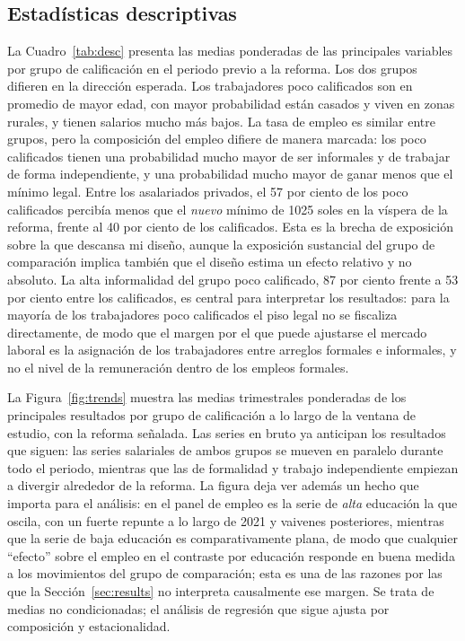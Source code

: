 \subsection{Estadísticas descriptivas}

La Cuadro~\ref{tab:desc} presenta las medias ponderadas de las principales variables por grupo de calificación en el periodo previo a la reforma. Los dos grupos difieren en la dirección esperada. Los trabajadores poco calificados son en promedio de mayor edad, con mayor probabilidad están casados y viven en zonas rurales, y tienen salarios mucho más bajos. La tasa de empleo es similar entre grupos, pero la composición del empleo difiere de manera marcada: los poco calificados tienen una probabilidad mucho mayor de ser informales y de trabajar de forma independiente, y una probabilidad mucho mayor de ganar menos que el mínimo legal. Entre los asalariados privados, el 57 por ciento de los poco calificados percibía menos que el \emph{nuevo} mínimo de 1025 soles en la víspera de la reforma, frente al 40 por ciento de los calificados. Esta es la brecha de exposición sobre la que descansa mi diseño, aunque la exposición sustancial del grupo de comparación implica también que el diseño estima un efecto relativo y no absoluto. La alta informalidad del grupo poco calificado, 87 por ciento frente a 53 por ciento entre los calificados, es central para interpretar los resultados: para la mayoría de los trabajadores poco calificados el piso legal no se fiscaliza directamente, de modo que el margen por el que puede ajustarse el mercado laboral es la asignación de los trabajadores entre arreglos formales e informales, y no el nivel de la remuneración dentro de los empleos formales.



La Figura~\ref{fig:trends} muestra las medias trimestrales ponderadas de los principales resultados por grupo de calificación a lo largo de la ventana de estudio, con la reforma señalada. Las series en bruto ya anticipan los resultados que siguen: las series salariales de ambos grupos se mueven en paralelo durante todo el periodo, mientras que las de formalidad y trabajo independiente empiezan a divergir alrededor de la reforma. La figura deja ver además un hecho que importa para el análisis: en el panel de empleo es la serie de \emph{alta} educación la que oscila, con un fuerte repunte a lo largo de 2021 y vaivenes posteriores, mientras que la serie de baja educación es comparativamente plana, de modo que cualquier ``efecto'' sobre el empleo en el contraste por educación responde en buena medida a los movimientos del grupo de comparación; esta es una de las razones por las que la Sección~\ref{sec:results} no interpreta causalmente ese margen. Se trata de medias no condicionadas; el análisis de regresión que sigue ajusta por composición y estacionalidad.

